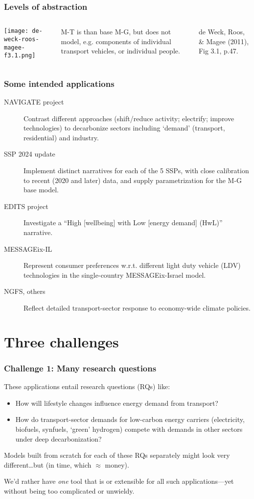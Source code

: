 \documentclass[12pt,aspectratio=169]{beamer}
\begin{document}
\begin{frame}
\frametitle{Levels of abstraction}
\begin{columns}[b]
\texttt{[image: de-weck-roos-magee-f3.1.png]}

M-T is  than base M-G, but does not model, e.g. components of individual transport vehicles, or individual people.

\bigskip
de Weck, Roos, \& Magee (2011), Fig 3.1, p.47.
\end{columns}
\end{frame}

\begin{frame}
\frametitle{Some intended applications}
\begin{description}
  \item [NAVIGATE project] Contrast different approaches (shift/reduce activity; electrify; improve technologies) to decarbonize sectors including ‘demand’ (transport, residential) and industry.
  \item [SSP 2024 update] Implement distinct narratives for each of the 5 SSPs, with close calibration to recent (2020 and later) data, and supply parametrization for the M-G base model.
  \item [EDITS project] Investigate a “High [wellbeing] with Low [energy demand] (HwL)” narrative.
  \item [MESSAGEix-IL] Represent consumer preferences w.r.t. different light duty vehicle (LDV) technologies in the single-country MESSAGEix-Israel model.
  \item [NGFS, others] Reflect detailed transport-sector response to economy-wide climate policies.
\end{description}

\end{frame}

\section{Three challenges}

\begin{frame}
\frametitle{Challenge 1: Many research questions}
These applications entail research questions (RQs) like:
\begin{itemize}
  \item How will lifestyle changes influence energy demand from transport?
  \item How do transport-sector demands for low-carbon energy carriers (electricity, biofuels, synfuels, ‘green’ hydrogen) compete with demands in other sectors under deep decarbonization?
\end{itemize}

\bigskip
Models built from scratch for each of these RQs separately might look very different…but  (in time, which $\approx$ money).

\bigskip
We'd rather have \emph{one} tool that is  or extensible for all such applications—yet without being too complicated or unwieldy.
\end{frame}
\end{document}

